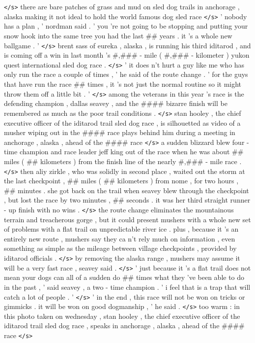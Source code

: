 \documentclass[12pt]{report}
\begin{document}
\begin{appendices}
\texttt{</s>} there are bare patches of grass and mud on sled dog trails in anchorage , alaska making it not ideal to hold the world famous dog sled race \texttt{</s>} ' nobody has a plan , ' nordman said . ' you 're not going to be stopping and putting your snow hook into the same tree you had the last \#\# years . it 's a whole new ballgame . ' \texttt{</s>} brent sass of eureka , alaska , is running his third iditarod , and is coming off a win in last month 's \#,\#\#\# - mile ( \#,\#\#\# - kilometer ) yukon quest international sled dog race . \texttt{</s>} ' it does n't hurt a guy like me who has only run the race a couple of times , ' he said of the route change . ' for the guys that have run the race \#\# times , it 's not just the normal routine so it might throw them off a little bit . ' \texttt{</s>} among the veterans in this year 's race is the defending champion , dallas seavey , and the \#\#\#\# bizarre finish will be remembered as much as the poor trail conditions . \texttt{</s>} stan hooley , the chief executive officer of the iditarod trail sled dog race , is silhouetted as video of a musher wiping out in the \#\#\#\# race plays behind him during a meeting in anchorage , alaska , ahead of the \#\#\#\# race \texttt{</s>} a sudden blizzard blew four - time champion and race leader jeff king out of the race when he was about \#\# miles ( \#\# kilometers ) from the finish line of the nearly \#,\#\#\# - mile race . \texttt{</s>} then aliy zirkle , who was solidly in second place , waited out the storm at the last checkpoint , \#\# miles ( \#\# kilometers ) from nome , for two hours , \#\# minutes . she got back on the trail when seavey blew through the checkpoint , but lost the race by two minutes , \#\# seconds . it was her third straight runner - up finish with no wins . \texttt{</s>} the route change eliminates the mountainous terrain and treacherous gorge , but it could present mushers with a whole new set of problems with a flat trail on unpredictable river ice . plus , because it 's an entirely new route , mushers say they ca n't rely much on information , even something as simple as the mileage between village checkpoints , provided by iditarod officials . \texttt{</s>} by removing the alaska range , mushers may assume it will be a very fast race , seavey said . \texttt{</s>} ' just because it 's a flat trail does not mean your dogs can all of a sudden do \#\# times what they 've been able to do in the past , ' said seavey , a two - time champion . ' i feel that is a trap that will catch a lot of people . ' \texttt{</s>} ' in the end , this race will not be won on tricks or gimmicks . it will be won on good dogmanship , ' he said . \texttt{</s>} too warm : in this photo taken on wednesday , stan hooley , the chief executive officer of the iditarod trail sled dog race , speaks in anchorage , alaska , ahead of the \#\#\#\# race \texttt{</s>}


\end{appendices}
\end{document}

